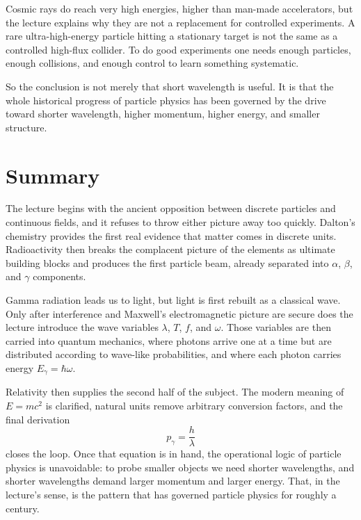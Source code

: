 Cosmic rays do reach very high energies, higher than man-made accelerators, but the lecture explains why they are not a replacement for controlled experiments. A rare ultra-high-energy particle hitting a stationary target is not the same as a controlled high-flux collider. To do good experiments one needs enough particles, enough collisions, and enough control to learn something systematic.

So the conclusion is not merely that short wavelength is useful. It is that the whole historical progress of particle physics has been governed by the drive toward shorter wavelength, higher momentum, higher energy, and smaller structure.

\section{Summary}

The lecture begins with the ancient opposition between discrete particles and continuous fields, and it refuses to throw either picture away too quickly. Dalton's chemistry provides the first real evidence that matter comes in discrete units. Radioactivity then breaks the complacent picture of the elements as ultimate building blocks and produces the first particle beam, already separated into \(\alpha\), \(\beta\), and \(\gamma\) components.

Gamma radiation leads us to light, but light is first rebuilt as a classical wave. Only after interference and Maxwell's electromagnetic picture are secure does the lecture introduce the wave variables \(\lambda\), \(T\), \(f\), and \(\omega\). Those variables are then carried into quantum mechanics, where photons arrive one at a time but are distributed according to wave-like probabilities, and where each photon carries energy \(E_\gamma=\hbar\omega\).

Relativity then supplies the second half of the subject. The modern meaning of \(E=mc^2\) is clarified, natural units remove arbitrary conversion factors, and the final derivation
\begin{equation}
p_\gamma = \frac{h}{\lambda}
\end{equation}
closes the loop. Once that equation is in hand, the operational logic of particle physics is unavoidable: to probe smaller objects we need shorter wavelengths, and shorter wavelengths demand larger momentum and larger energy. That, in the lecture's sense, is the pattern that has governed particle physics for roughly a century.